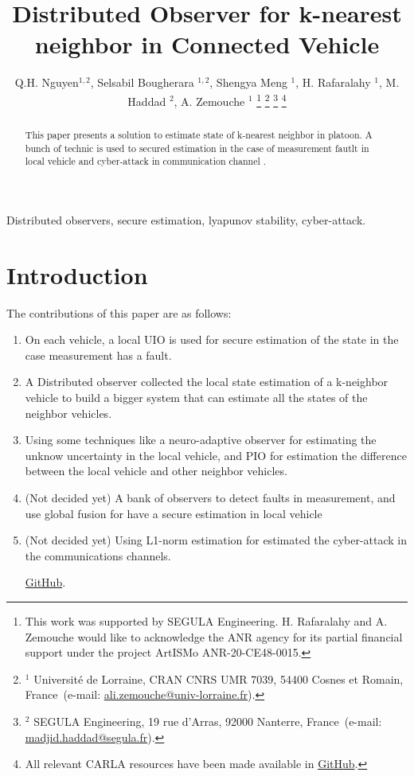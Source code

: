 \documentclass[letterpaper, 10pt, conference]{ieeeconf}  %
\begin{document}
\title{\bf Distributed Observer for k-nearest neighbor in Connected Vehicle }
\author{Q.H. Nguyen$^{1,2}$, Selsabil Bougherara $^{1,2}$, Shengya Meng $^{1}$, H. Rafaralahy $^{1}$, M. Haddad $^{2}$, A. Zemouche $^{1}$
%
\thanks{This work was supported by SEGULA Engineering. H. Rafaralahy and A. Zemouche would like to acknowledge the ANR agency for its partial financial support under the project ArtISMo ANR-20-CE48-0015.
}
%
\thanks{$^{1}$ Universit\'e de Lorraine, CRAN  CNRS UMR 7039, 54400 Cosnes et Romain, France~(e-mail: \protect\url{ali.zemouche@univ-lorraine.fr}).}
%
\thanks{$^{2}$ SEGULA Engineering, 19 rue d'Arras, 92000 Nanterre, France~(e-mail: \protect\url{madjid.haddad@segula.fr}).}
%
\thanks{All relevant CARLA resources have been made available in \protect\href{https://github.com/kslhuy/CACC_UIO_simulink}{GitHub}.}
}
\maketitle

\begin{abstract}
This paper presents a solution to estimate state of k-nearest neighbor in platoon. A bunch of technic is used to secured estimation in the case of measurement fautlt in local vehicle and cyber-attack in communication channel .
\end{abstract}

\begin{keywords}
Distributed observers, secure estimation, lyapunov stability, cyber-attack.
\end{keywords}

\section{Introduction}
    

The contributions of this paper are as follows:
\begin{enumerate}
\item On each vehicle, a local UIO is used for secure estimation of the state in the case measurement has a fault. 
\item A Distributed observer collected the local state estimation of a k-neighbor vehicle to build a bigger system that can estimate all the states of the neighbor vehicles.
\item Using some techniques like a neuro-adaptive observer for estimating the unknow uncertainty in the local vehicle, and PIO for estimation the difference between the local vehicle and other neighbor vehicles. 
\item (Not decided yet) A bank of observers to detect faults in measurement, and use global fusion for have a secure estimation in local vehicle 
\item (Not decided yet) Using L1-norm estimation for estimated the cyber-attack in the communications channels.

\protect\href{https://github.com/kslhuy/CACC_UIO_simulink}{GitHub}.
\end{enumerate}
\end{document}
